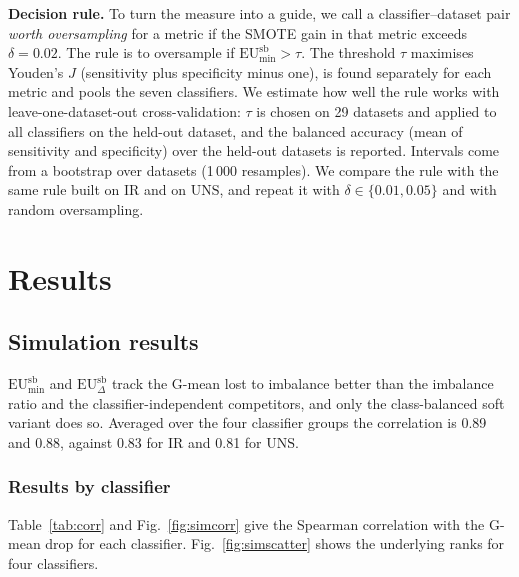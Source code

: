 \documentclass[preprint,12pt]{elsarticle}
\newcommand{\EUmin}[1]{\mathrm{EU}^{\mathrm{#1}}_{\min}}
\newcommand{\EUdif}[1]{\mathrm{EU}^{\mathrm{#1}}_{\Delta}}
\newcommand{\IR}{\mathrm{IR}}
\newcommand{\UNS}{\mathrm{UNS}}
\begin{document}
\textbf{Decision rule.} To turn the measure into a guide, we call a classifier--dataset pair \emph{worth oversampling} for a metric if the SMOTE gain in that metric exceeds $\delta=0.02$. The rule is to oversample if $\EUmin{sb}>\tau$. The threshold $\tau$ maximises Youden's $J$ (sensitivity plus specificity minus one), is found separately for each metric and pools the seven classifiers. We estimate how well the rule works with leave-one-dataset-out cross-validation: $\tau$ is chosen on 29 datasets and applied to all classifiers on the held-out dataset, and the balanced accuracy (mean of sensitivity and specificity) over the held-out datasets is reported. Intervals come from a bootstrap over datasets (1\,000 resamples). We compare the rule with the same rule built on $\IR$ and on $\UNS$, and repeat it with $\delta\in\{0.01,0.05\}$ and with random oversampling.


\section{Results}\label{sec:results}
\subsection{Simulation results}\label{sec:simres}
$\EUmin{sb}$ and $\EUdif{sb}$ track the G-mean lost to imbalance better than the imbalance ratio and the classifier-independent competitors, and only the class-balanced soft variant does so. Averaged over the four classifier groups the correlation is 0.89 and 0.88, against 0.83 for $\IR$ and 0.81 for $\UNS$.

\subsubsection{Results by classifier}
Table~\ref{tab:corr} and Fig.~\ref{fig:simcorr} give the Spearman correlation with the G-mean drop for each classifier. Fig.~\ref{fig:simscatter} shows the underlying ranks for four classifiers.
\end{document}
